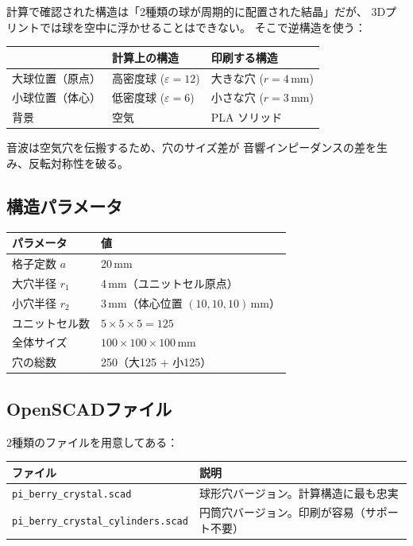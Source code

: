\documentclass[11pt,a4paper]{article}
\def\textbf#1{#1}%
\begin{document}
計算で確認された構造は「2種類の球が周期的に配置された結晶」だが、
3Dプリントでは球を空中に浮かせることはできない。
そこで\textbf{逆構造}を使う：

\begin{center}
\begin{tabular}{lp{5cm}p{5cm}}
\toprule
& 計算上の構造 & 印刷する構造 \\
\midrule
大球位置（原点） & 高密度球 ($\varepsilon=12$) & 大きな穴 ($r=4$\,mm) \\
小球位置（体心） & 低密度球 ($\varepsilon=6$) & 小さな穴 ($r=3$\,mm) \\
背景 & 空気 & PLA ソリッド \\
\bottomrule
\end{tabular}
\end{center}

音波は空気穴を伝搬するため、穴のサイズ差が
音響インピーダンスの差を生み、反転対称性を破る。

\subsection{構造パラメータ}

\begin{center}
\begin{tabular}{ll}
\toprule
パラメータ & 値 \\
\midrule
格子定数 $a$ & 20\,mm \\
大穴半径 $r_1$ & 4\,mm（ユニットセル原点） \\
小穴半径 $r_2$ & 3\,mm（体心位置 $(10, 10, 10)$\,mm） \\
ユニットセル数 & $5 \times 5 \times 5 = 125$ \\
全体サイズ & $100 \times 100 \times 100$\,mm \\
穴の総数 & 250（大125 + 小125） \\
\bottomrule
\end{tabular}
\end{center}

\subsection{OpenSCADファイル}

2種類のファイルを用意してある：

\begin{center}
\begin{tabular}{lp{8cm}}
\toprule
ファイル & 説明 \\
\midrule
\texttt{pi\_berry\_crystal.scad} & 球形穴バージョン。計算構造に最も忠実 \\
\texttt{pi\_berry\_crystal\_cylinders.scad} & 円筒穴バージョン。印刷が容易（サポート不要） \\
\bottomrule
\end{tabular}
\end{center}
\end{document}
